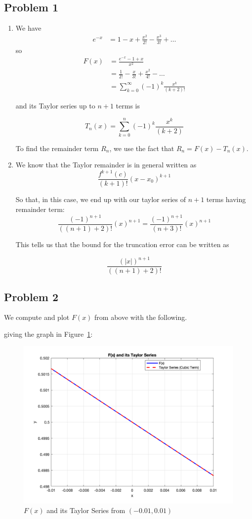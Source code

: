 \documentclass[letter,11pt]{article}
\begin{document}
\subsection{Problem 1}
\begin{enumerate}[label=\alph*.]
  \item We have \begin{align*}
    e^{-x} &= 1 - x + \frac{x^2}{2!} - \frac{x^3}{3!} + \dots
  \end{align*}
  so
  \begin{align*}
    F(x) &= \frac{e^{-x} - 1 + x}{x^2} \\
    &= \frac{1}{2!} - \frac{x}{3!} + \frac{x^2}{4!} - \dots \\
    &= \sum_{k = 0}^\infty (-1)^k \frac{x^k}{(k + 2)!}
  \end{align*}

  and its Taylor series up to $n + 1$ terms is

  $$
  T_n(x) = \sum_{k = 0}^n (-1)^k \frac{x^k}{(k + 2)}
  $$

  To find the remainder term $R_n$, we use the fact that $R_n = F(x) - T_n(x)$. 
  \item We know that the Taylor remainder is in general written as
  $$\frac{f^{k+1}(c)}{(k+1)!}(x-x_0)^{k+1}$$

 So that, in this case, we end up with our taylor series of $n+1$ terms having remainder term:
 $$\frac{(-1)^{n+1}}{((n+1)+2)!}(x)^{n+1} = \frac{(-1)^{n+1}}{(n+3)!}(x)^{n+1}$$

 This tells us that the bound for the truncation error can be written as

 $$\frac{(|x|)^{n+1}}{((n+1)+2)!}$$
\end{enumerate}

\newpage
\subsection{Problem 2}
We compute and plot $F(x)$ from above with the following.
  
  

  

giving the graph in Figure~\ref{fig:lab1b_2}:

\begin{figure}[h]
  \centering
  \includegraphics[width=0.8\linewidth]{lab1b_2.png}
  \caption{$F(x)$ and its Taylor Series from $(-0.01, 0.01)$}
  \label{fig:lab1b_2}
\end{figure}
\end{document}
